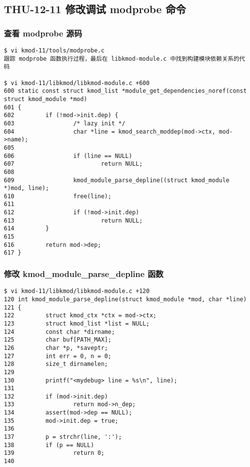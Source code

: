 \documentclass[11pt,a4paper]{article}
\begin{document}
\subsection{THU-12-11 修改调试 modprobe 命令}

\subsubsection{查看 modprobe 源码}

{\begin{shaded}\begin{verbatim}
$ vi kmod-11/tools/modprobe.c 
跟踪 modprobe 函数执行过程，最后在 libkmod-module.c 中找到构建模块依赖关系的代码

$ vi kmod-11/libkmod/libkmod-module.c +600
600 static const struct kmod_list *module_get_dependencies_noref(const struct kmod_module *mod)
601 {
602         if (!mod->init.dep) {
603                 /* lazy init */
604                 char *line = kmod_search_moddep(mod->ctx, mod->name);
605 
606                 if (line == NULL)
607                         return NULL;
608 
609                 kmod_module_parse_depline((struct kmod_module *)mod, line);
610                 free(line);
611 
612                 if (!mod->init.dep)
613                         return NULL;
614         }
615 
616         return mod->dep;
617 }
\end{verbatim}\end{shaded}}
\subsubsection{修改 kmod\_module\_parse\_depline 函数}

{\begin{shaded}\begin{verbatim}
$ vi kmod-11/libkmod/libkmod-module.c +120
120 int kmod_module_parse_depline(struct kmod_module *mod, char *line)
121 {
122         struct kmod_ctx *ctx = mod->ctx;
123         struct kmod_list *list = NULL;
124         const char *dirname;
125         char buf[PATH_MAX];
126         char *p, *saveptr;
127         int err = 0, n = 0;
128         size_t dirnamelen;
129 
130         printf("<mydebug> line = %s\n", line);
131 
132         if (mod->init.dep)
133                 return mod->n_dep;
134         assert(mod->dep == NULL);
135         mod->init.dep = true;
136 
137         p = strchr(line, ':');
138         if (p == NULL)
139                 return 0;
140 
\end{verbatim}\end{shaded}}
\end{document}
